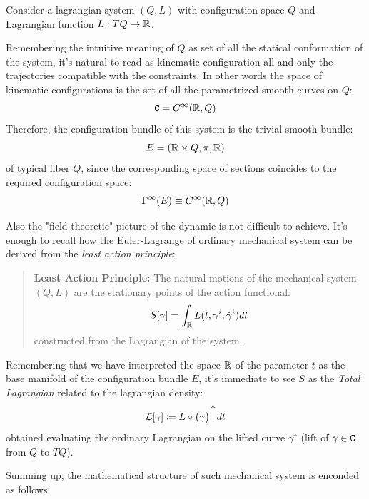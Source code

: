 \documentclass[Main]{subfiles}
\begin{document}
			Consider a lagrangian system $(Q, L)$ with configuration space $Q$ and Lagrangian function $L: TQ\rightarrow \mathbb{R}$.
			
			Remembering the intuitive meaning of $Q$ as set of all the statical conformation of the system, it's natural to read as kinematic configuration all and only the trajectories compatible with the constraints.
			In other words the space of kinematic configurations is the set of all the parametrized smooth curves on $Q$:
			\begin{displaymath}
				\mathtt{C} = C^\infty(\mathbb{R},Q)
			\end{displaymath}
			Therefore, the configuration bundle of this system is the trivial smooth bundle:
			\begin{displaymath}
				E= ( \mathbb{R}\times Q, \pi, \mathbb{R})
			\end{displaymath}
			of typical fiber $Q$, since the corresponding space of sections coincides to  the required configuration space:
			\begin{displaymath}
				\Gamma^\infty(E) \equiv C^\infty(\mathbb{R},Q)
			\end{displaymath}

			Also the "field theoretic" picture of the dynamic is not difficult to achieve.
			It's enough to recall how the Euler-Lagrange of ordinary mechanical system can be derived from the \emph{least action principle}:
			\begin{quotation}
				\textbf{Least Action Principle:}
				The natural motions of the mechanical system $(Q,L)$ are the stationary points of the action functional:
				\begin{displaymath}
					S [\gamma]= \int_{\mathbb{R}} L(t,\gamma^i, \dot{\gamma}^i) dt
				\end{displaymath}
				constructed from the Lagrangian of the system.
			\end{quotation}
			Remembering that we have interpreted the space $\mathbb{R}$ of the parameter $t$ as the base manifold of the configuration bundle $E$, it's immediate to see $S$ as the \emph{Total Lagrangian} related to the lagrangian density:
			\begin{displaymath}
				\mathcal{L}[\gamma] \coloneqq L \circ \big( \gamma \big)^{\big\uparrow} dt
			\end{displaymath}
			obtained evaluating the ordinary Lagrangian on the lifted curve $\gamma^\uparrow$ (lift of $\gamma\in \mathtt{C}$ from $Q$ to $TQ$).
		


		Summing up, the mathematical structure of such mechanical system is enconded as follows:
			
\end{document}
